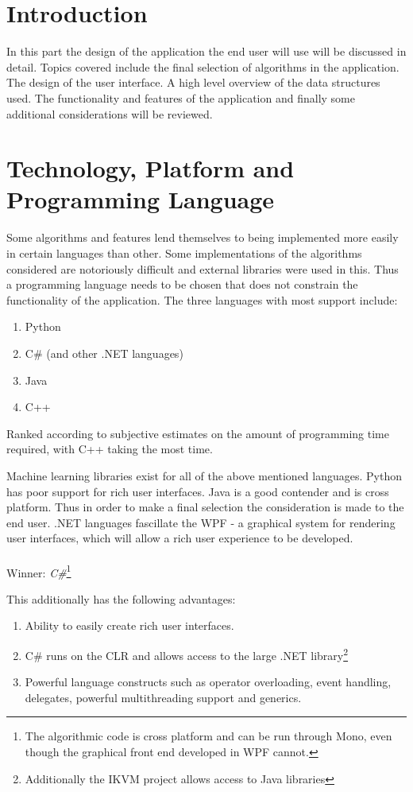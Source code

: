

\chapter{Introduction}
In this part the design of the application the end user will use will be discussed in detail. Topics covered include the final selection of algorithms in the application. The design of the user interface. A high level overview of the data structures used. The functionality and features of the application and finally some additional considerations will be reviewed.

\chapter{Technology, Platform and Programming Language}
Some algorithms and features lend themselves to being implemented more easily in certain languages than other. Some implementations of the algorithms considered are notoriously difficult and external libraries were used in this. Thus a programming language needs to be chosen that does not constrain the functionality of the application. 
The three languages with most support include:
\begin{enumerate}
\item Python
\item C\# (and other .NET languages)
\item Java
\item C++
\end{enumerate}
Ranked according to subjective estimates on the amount of programming time required, with C++ taking the most time.

Machine learning libraries exist for all of the above mentioned languages. Python has poor support for rich user interfaces. Java is a good contender and is cross platform. Thus in order to make a final selection the consideration is made to the end user.  .NET languages fascillate the \ac{WPF} - a graphical system for rendering user interfaces, which will allow a rich user experience to be developed.
\\
\\
Winner: \emph{C\#}\footnote{The algorithmic code is cross platform and can be run through Mono, even though the graphical front end developed in \ac{WPF} cannot.}

This additionally has the following advantages:
\begin{enumerate}
\item Ability to easily create rich user interfaces.
\item C\# runs on the CLR and allows access to the large .NET library\footnote{Additionally the IKVM project allows access to Java libraries}
\item Powerful language constructs such as operator overloading, event handling, delegates, powerful multithreading support and generics.
\end{enumerate}


